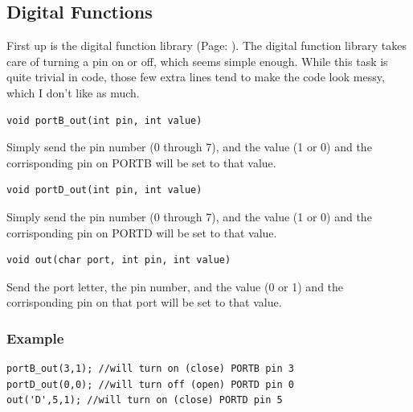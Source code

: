 \documentclass{article}
\begin{document}
\subsection{Digital Functions}
First up is the digital function library (Page: \pageref{digital}). The digital function library takes care of turning a pin on or off, which seems simple enough. While this task is quite trivial in code, those few extra lines tend to make the code look messy, which I don't like as much.\\
\begin{verbatim}void portB_out(int pin, int value)\end{verbatim}
Simply send the pin number (0 through 7), and the value (1 or 0) and the corrisponding pin on PORTB will be set to that value.\\
\begin{verbatim}void portD_out(int pin, int value)\end{verbatim}
Simply send the pin number (0 through 7), and the value (1 or 0) and the corrisponding pin on PORTD will be set to that value.\\
\begin{verbatim}void out(char port, int pin, int value)\end{verbatim}
Send the port letter, the pin number, and the value (0 or 1) and the corrisponding pin on that port will be set to that value.\\
\subsubsection{Example}
\begin{lstlisting}[caption={Digital examples},label=digitalex,frame=tbl]
portB_out(3,1); //will turn on (close) PORTB pin 3
portD_out(0,0); //will turn off (open) PORTD pin 0
out('D',5,1); //will turn on (close) PORTD pin 5
\end{lstlisting}
\end{document}
